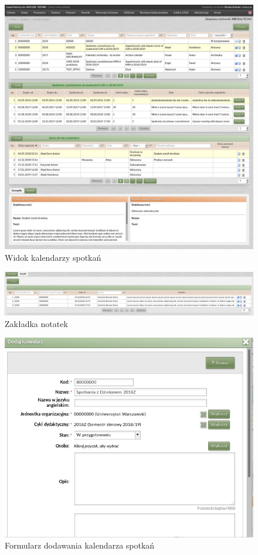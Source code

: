 \documentclass[licencjacka]{pracamgr}
\begin{document}
\begin{figure}[!]
  \includegraphics[width=\linewidth]{widok_kalendarzy.jpg}
  \caption{Widok kalendarzy spotkań}
  \label{fig:kalenadm}
\end{figure}

\begin{figure}[!]
  \includegraphics[width=\linewidth]{widok_kalendarzy_tabela_notatek.jpg}
  \caption{Zakładka notatek}
  \label{fig:kalennotadm}
\end{figure}

\begin{figure}[!]
  \includegraphics[width=\linewidth]{formularz_kalendarzy.jpg}
  \caption{Formularz dodawania kalendarza spotkań}
  \label{fig:kalenformkalenadm}
\end{figure}
\end{document}
